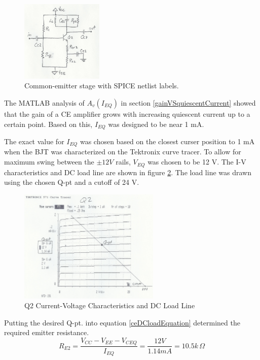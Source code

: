 \documentclass[titlepage, letterpaper, 11pt]{article}
\begin{document}
\begin{figure}[ht]
	\centering
	\includegraphics[width=0.35\textwidth]
		{figures/commonEmitterStage}
	\caption{
		Common-emitter stage with SPICE netlist labels.
	}
	\label{commonEmitterStage}
\end{figure}

The MATLAB analysis of $A_{v}(I_{EQ})$ in section
\ref{gainVSquiescentCurrent} showed that the gain of a CE amplifier
grows with increasing quiescent current up to a certain point. Based
on this, $I_{EQ}$ was designed to be near 1 mA.

The exact value for $I_{EQ}$ was chosen based on the closest curser
position to 1 mA when the BJT was characterized on the Tektronix
curve tracer. To allow for maximum swing between the $\pm12V$ rails,
$V_{EQ}$ was chosen to be 12 V. The I-V characteristics and DC load
line are shown in figure \ref{q2Characteristics}. The load line was
drawn using the chosen Q-pt and a cutoff of 24 V.

\begin{figure}[ht]
	\centering
	\includegraphics[width=0.6\textwidth]
		{measurements/q2Characteristics}
	\caption{
		Q2 Current-Voltage Characteristics and DC Load Line
	}
	\label{q2Characteristics}
\end{figure}

Putting the desired Q-pt. into equation \ref{ceDCloadEquation}
determined the required emitter resistance.
\begin{equation*}
R_{E2}=\frac{V_{CC}-V_{EE}-V_{CEQ}}{I_{EQ}}=\frac{12V}{1.14mA}
=10.5k\,\Omega
\end{equation*}
\end{document}
